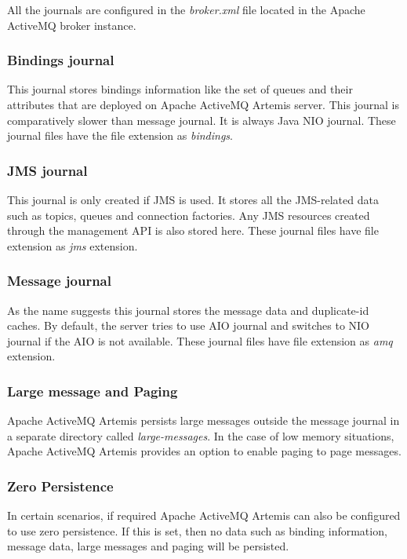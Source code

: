 All the journals are configured in the \textit{broker.xml} file located in the Apache ActiveMQ broker instance.

\subsubsection{Bindings journal}

This journal stores bindings information like the set of queues and their attributes that are deployed on Apache ActiveMQ Artemis server. This journal is comparatively slower than message journal. It is always Java NIO journal. These journal files have the file extension as \textit{bindings}.

\subsubsection{JMS journal}

This journal is only created if JMS is used. It stores all the JMS-related data such as topics, queues and connection factories. Any JMS resources created through the management API is also stored here. These journal files have file extension as \textit{jms} extension.

\subsubsection{Message journal}

As the name suggests this journal stores the message data and duplicate-id caches. By default, the server tries to use AIO journal and switches to NIO journal if the AIO is not available. These journal files have file extension as \textit{amq} extension.

\subsubsection{Large message and Paging}
Apache ActiveMQ Artemis persists large messages outside the message journal in a separate directory called \textit{large-messages}. In the case of low memory situations, Apache ActiveMQ Artemis provides an option to enable paging to page messages.

\subsubsection{Zero Persistence}

In certain scenarios, if required Apache ActiveMQ Artemis can also be configured to use zero persistence. If this is set, then no data such as binding information, message data, large messages and paging will be persisted. 
